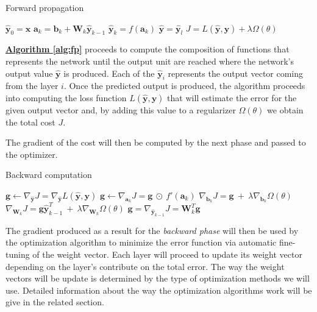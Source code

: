 \begin{algorithm}[H]
	\caption{Forward propagation}
	\label{alg:fp}
	\begin{algorithmic}[1]
		\State $\mathbf{\hat{y}}_{0} = \mathbf{x}$
		\State $\mathbf{a}_{k} = \mathbf{b}_{k} + \mathbf{W}_{k}\mathbf{\hat{y}}_{k - 1}$
		\State $\mathbf{\hat{y}}_{k} = f(\mathbf{a}_{k})$
		\EndFor
		\State $\mathbf{\hat{y}} = \mathbf{\hat{y}}_{l}$
		\State $J = L(\mathbf{\hat{y}}, \mathbf{y}) + \lambda \Omega(\theta)$
		\EndProcedure
	\end{algorithmic}
\end{algorithm}

\hyperref[alg:fp]{\textbf{Algorithm \ref{alg:fp}}} proceeds to compute the composition of functions that represents the network until the output unit are reached where the network's output value ${\hat{\textbf{y}}}$ is produced. Each of the ${\hat{\textbf{y}}}_i$ represents the output vector coming from the layer $\textit{i}$. Once the predicted output is produced, the algorithm proceeds into computing the loss function $L(\mathbf{\hat{\textbf{y}}}, \mathbf{\textbf{y}})$ that will estimate the error for the given output vector and, by adding this value to a regularizer $\Omega(\theta)$ we obtain the total cost $\textit{J}$.

The gradient of the cost will then be computed by the next phase and passed to the optimizer. 

\begin{algorithm}[H]
	\caption{Backward computation}
	\label{alg:bp}
	\begin{algorithmic}[1]
		\State $\mathbf{g} \leftarrow \nabla_{\hat{\mathbf{y}}}J = \nabla_{\hat{\mathbf{y}}}
		L(\mathbf{\hat{y}}, \mathbf{y})$
		\State $\mathbf{g} \leftarrow \nabla_{\mathbf{a}_{k}}J = \mathbf{g} \ \odot \
		f'(\mathbf{a}_{k})$
		\State $\nabla_{\mathbf{b}_{k}}J = \mathbf{g} \ + \ \lambda \nabla_{\mathbf{b}_{k}}
		\Omega(\theta)$
		\State $\nabla_{\mathbf{W}_{k}}J = \mathbf{g}\mathbf{\hat{y}}_{k - 1}^{T} \ + \ \lambda
		\nabla_{\mathbf{W}_{k}} \Omega(\theta)$
		\State $\mathbf{g} = \nabla_{\mathbf{\hat{y}}_{k - 1}}J = \mathbf{W}_{k}^{T}\mathbf{g}$
		\EndFor
		\EndProcedure
	\end{algorithmic}
\end{algorithm}

The gradient produced as a result for the \textit{backward phase} will then be used by the optimization algorithm to minimize the error function via automatic fine-tuning of the weight vector. Each layer will proceed to update its weight vector depending on the layer's contribute on the total error. The way the weight vectors will be update is determined by the type of optimization methods we will use. Detailed information about the way the optimization algorithms work will be give in the related section.

